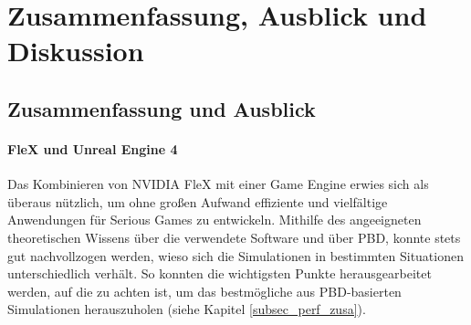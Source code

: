 \chapter{Zusammenfassung, Ausblick und Diskussion}

\section{Zusammenfassung und Ausblick}


\subsubsection{FleX und Unreal Engine 4}
Das Kombinieren von NVIDIA FleX mit einer Game Engine erwies sich als überaus nützlich, um ohne großen Aufwand effiziente und vielfältige Anwendungen für Serious Games zu entwickeln. 
Mithilfe des angeeigneten theoretischen Wissens über die verwendete Software und über PBD, konnte stets gut nachvollzogen werden, wieso sich die Simulationen in bestimmten Situationen unterschiedlich verhält. 
So konnten die wichtigsten Punkte herausgearbeitet werden, auf die zu achten ist, um das bestmögliche aus PBD-basierten Simulationen herauszuholen (siehe Kapitel \ref{subsec_perf_zusa}). 


